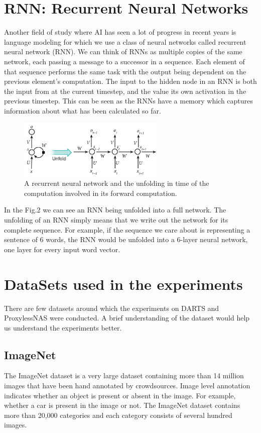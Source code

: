 \documentclass{ieee}
\begin{document}
\section{RNN: Recurrent Neural Networks}
Another field of study where AI has seen a lot of progress in recent years is language modeling for which we use a class of neural networks called recurrent neural network (RNN). We can think of RNNs as multiple copies of the same network, each passing a message to a successor in a sequence. Each element of that sequence performs the same task with the output being dependent on the previous element's computation.  The input to the hidden node in an RNN is both the input from at the current timestep, and the value its own activation in the previous timestep. This can be seen as the RNNs have a memory which captures information about what has been calculated so far.
\begin{figure}[h]
    \begin{center}
    \includegraphics[width=7cm]{images/rnn.jpg}
    \end{center}
    \label{fig:rnn_fig}
    \caption{A recurrent neural network and the unfolding in time of the computation involved in its forward computation. \cite{RNN}}
\end{figure}

In the Fig.2 we can see an RNN being unfolded into a full network. The unfolding of an RNN simply means that we write out the network for its complete sequence. For example, if the sequence we care about is representing a sentence of 6 words, the RNN would be unfolded into a 6-layer neural network, one layer for every input word vector.

\section{DataSets used in the experiments}
There are few datasets around which the experiments on DARTS and ProxylessNAS were conducted. A brief understanding of the dataset would help us understand the experiments better.
\subsection{ImageNet}
The ImageNet dataset is a very large dataset containing more than 14 million images that have been hand annotated by crowdsources. Image level annotation indicates whether an object is present or absent in the image. For example, whether a car is present in the image or not. The ImageNet dataset contains more than 20,000 categories and each category consists of several hundred images.
\end{document}
